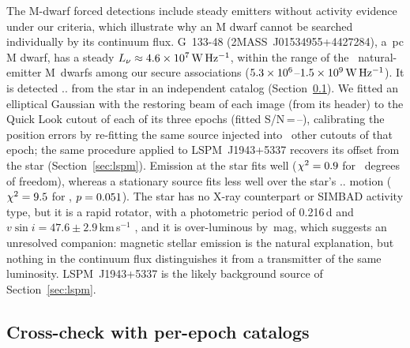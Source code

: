 \documentclass[linenumbers]{aastex702}
\makeatletter
\newcommand{\asec}[1]{\expandafter\asec@i#1..\@nil}
\def\asec@i#1.#2.#3\@nil{\ifx\relax#2\relax#1\arcsec\else#1\farcs#2\fi}
\newcommand{\Lnu}{L_\nu}
\newcommand{\WHz}{\mathrm{W\,Hz^{-1}}}
\makeatother
\begin{document}
The M-dwarf forced detections include steady emitters without activity evidence under our criteria, which illustrate why an M dwarf cannot be searched individually by its continuum flux. G~133-48 (2MASS~J01534955+4427284), a \GOTEd\,pc M dwarf, has a steady $\Lnu\approx\GOTEL\,\WHz$, within the range of the \NMSecNat\ natural-emitter M~dwarfs among our secure associations ($5.3\times10^{6}$--$\MSecLhi\,\WHz$). It is detected \asec{\GOTEsep} from the star in an independent catalog (Section~\ref{sec:catcheck}). We fitted an elliptical Gaussian with the restoring beam of each image (from its header) to the Quick Look cutout of each of its three epochs (fitted S/N\,=\,\GoteSnrLo--\GoteSnrHi), calibrating the position errors by re-fitting the same source injected into \NInjAstro\ other cutouts of that epoch; the same procedure applied to LSPM~J1943+5337 recovers its offset from the star (Section~\ref{sec:lspm}). Emission at the star fits well ($\chi^2=0.9$ for \GoteDofStar\ degrees of freedom), whereas a stationary source fits less well over the star's \asec{\GoteMotion} motion ($\chi^2=9.5$ for \GoteDofStat, $p=0.051$). The star has no X-ray counterpart or SIMBAD activity type, but it is a rapid rotator, with a photometric period of 0.216\,d \citep{Newton2016} and $v\sin i=47.6\pm2.9$\,km\,s$^{-1}$ \citep{Kesseli2018}, and it is over-luminous by \GOTEdMG\,mag, which suggests an unresolved companion: magnetic stellar emission is the natural explanation, but nothing in the continuum flux distinguishes it from a transmitter of the same luminosity. LSPM~J1943+5337 is the likely background source of Section~\ref{sec:lspm}.





\subsection{Cross-check with per-epoch catalogs} \label{sec:catcheck}
\end{document}
